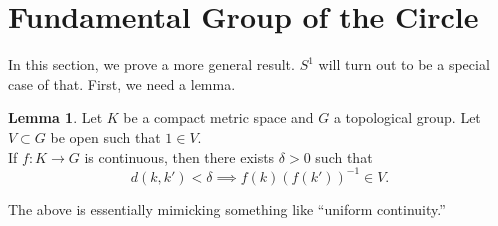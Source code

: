 \documentclass[12pt]{article}
\theoremstyle{definition}
\numberwithin{thm}{section}
\newtheorem{lem}[thm]{Lemma}
\begin{document}
\section{Fundamental Group of the Circle}
In this section, we prove a more general result. $S^1$ will turn out to be a special case of that. First, we need a lemma.
\begin{lem} \label{lem:unifcont}
	Let $K$ be a compact metric space and $G$ a topological group. Let $V \subset G$ be open such that $1 \in V.$\\
	If $f:K\to G$ is continuous, then there exists $\delta > 0$ such that 
	\begin{equation*} 
		d(k, k') < \delta \implies f(k)(f(k'))^{-1} \in V.
	\end{equation*}
\end{lem}
The above is essentially mimicking something like ``uniform continuity.''
\end{document}
